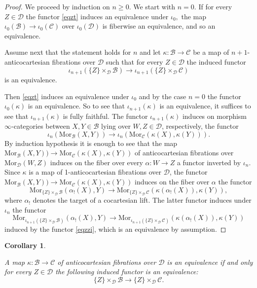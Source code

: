 \documentclass[10pt,oneside]{article}
\numberwithin{equation}{section} %
\numberwithin{figure}{section} %
\theoremstyle{plain}
\newtheorem{corollary}[theorem]{Corollary}
\theoremstyle{definition}
\newcommand{\mB}{{\mathcal B}}
\newcommand{\mC}{{\mathcal C}}
\newcommand{\mD}{{\mathcal D}}
\newcommand{\Mor}{{\mathrm{Mor}}}
\begin{document}
\begin{proof}
We proceed by induction on $n \geq 0$.
We start with $n=0.$
If for every $Z \in \mD$ the functor \ref{eqzt}
induces an equivalence under $\iota_0,$
the map $\iota_0(\mB) \to \iota_0(\mC)$
over $\iota_0(\mD)$ is fiberwise an equivalence,
and so an equivalence.

Assume next that the statement holds for $n$ and
let $\kappa: \mB \to \mC $ be a map of $n+1$-anticocartesian fibrations over $\mD$ such that for every $Z \in \mD$ 
the induced functor \begin{equation}\label{eqzzi} \iota_{n+1}(\{Z\} \times_\mD \mB) \to \iota_{n+1}(\{Z\} \times_\mD \mC)\end{equation} is an equivalence.

Then \ref{eqzt} induces an equivalence under $\iota_0$
and by the case $n=0$ the functor $\iota_0(\kappa)$ is an equivalence.
So to see that $\iota_{n+1}(\kappa)$ is an equivalence,
it suffices to see that $\iota_{n+1}(\kappa)$ is fully faithful.
The functor $\iota_{n+1}(\kappa)$ induces on morphism $\infty$-categories between $X,Y \in \mB$ lying over $W,Z \in \mD$, respectively, the functor
$$\iota_n(\Mor_\mB(X,Y)) \to \iota_n(\Mor_\mC(\kappa(X),\kappa(Y))).$$
By induction hypothesis it is enough to see that the map
$\Mor_\mB(X,Y)) \to \Mor_\mC(\kappa(X),\kappa(Y))$
of anticocartesian fibrations over $\Mor_\mD(W,Z) $  
induces on the fiber over every $\alpha: W \to Z $
a functor inverted by $\iota_n.$
Since $\kappa$ is a map of 1-anticocartesian fibrations over $\mD$,
the functor $\Mor_\mB(X,Y)) \to \Mor_\mC(\kappa(X),\kappa(Y))$ induces on the fiber over $\alpha$ the functor
$$ \Mor_{\{Z\} \times_\mD \mB}(\alpha_!(X),Y) \to \Mor_{\{Z\} \times_\mD \mC}(\kappa(\alpha_!(X)),\kappa(Y)),$$
where $\alpha_!$ denotes the target of a cocartesian lift.
The latter functor induces under $\iota_n$ the functor
$$ \Mor_{\iota_{n+1}(\{Z\} \times_\mD \mB)}(\alpha_!(X),Y) \to \Mor_{\iota_{n+1}(\{Z\} \times_\mD \mC)}(\kappa(\alpha_!(X)),\kappa(Y))$$ induced by the functor 
\ref{eqzzi}, which is an equivalence by assumption.
\end{proof}

\begin{corollary}\label{equivcocar}

A map $\kappa: \mB \to \mC$ of anticocartesian fibrations over $\mD$ is an equivalence if and only for every $Z \in \mD$ the following induced functor is an equivalence:
$$ \{Z\} \times_\mD \mB \to  \{Z\} \times_\mD \mC. $$
    
\end{corollary}
\end{document}
